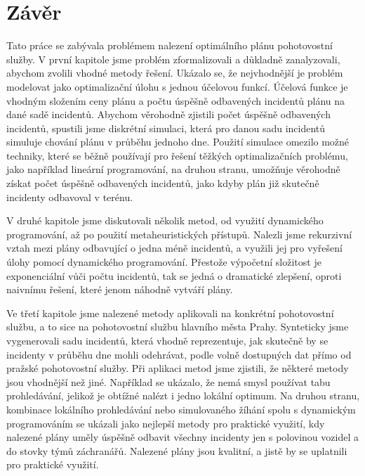 \chapter*{Závěr}

Tato práce se zabývala problémem nalezení optimálního plánu pohotovostní služby. 
V první kapitole jsme problém zformalizovali a důkladně zanalyzovali, abychom zvolili vhodné metody řešení.
Ukázalo se, že nejvhodnější je problém modelovat jako optimalizační úlohu s jednou účelovou funkcí.
Účelová funkce je vhodným složením ceny plánu a počtu úspěšně odbavených incidentů plánu na dané sadě incidentů.
Abychom věrohodně zjistili počet úspěšně odbavených incidentů, spustili jsme diskrétní simulaci, která pro danou sadu incidentů simuluje chování plánu v průběhu jednoho dne.
Použití simulace omezilo možné techniky, které se běžně používají pro řešení těžkých optimalizačních problému, jako například lineární programování,
na druhou stranu, umožňuje věrohodně získat počet úspěšně odbavených incidentů, jako kdyby plán již skutečně incidenty odbavoval v terénu.
 
V druhé kapitole jsme diskutovali několik metod, od využití dynamického programování, až po použití metaheuristických přístupů.
Nalezli jsme rekurzivní vztah mezi plány odbavující o jedna méně incidentů,
a využili jej pro vyřešení úlohy pomocí dynamického programování. Přestože výpočetní složitost je exponenciální vůči počtu incidentů, 
tak se jedná o dramatické zlepšení, oproti naivnímu řešení, které jenom náhodně vytváří plány.

Ve třetí kapitole jsme nalezené metody aplikovali na konkrétní pohotovostní službu, a to sice na pohotovostní službu hlavního města Prahy.
Synteticky jsme vygenerovali sadu incidentů, která vhodně reprezentuje, jak skutečně by se incidenty v průběhu dne mohli odehrávat, podle volně dostupných dat přímo od pražské pohotovostní služby.
Při aplikaci metod jsme zjistili, že některé metody jsou vhodnější než jiné. Například se ukázalo, že nemá smysl používat tabu prohledávání, jelikož je obtížné nalézt i jedno lokální optimum.
Na druhou stranu, kombinace lokálního prohledávání nebo simulovaného žíhání spolu s dynamickým programováním se ukázali jako nejlepší metody pro praktické využití,
kdy nalezené plány uměly úspěšně odbavit všechny incidenty jen s polovinou vozidel a do stovky týmů záchranářů.
Nalezené plány jsou kvalitní, a jistě by se uplatnili pro praktické využití.

